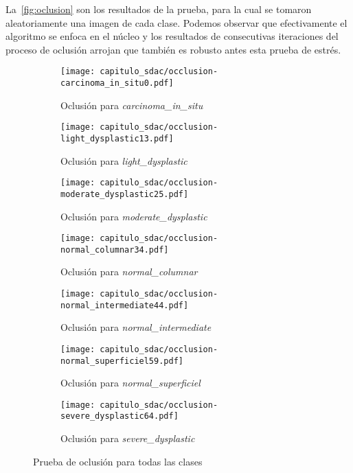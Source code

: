 La~\autoref{fig:oclusion} son los resultados de la prueba, para la cual se tomaron
aleatoriamente una imagen de cada clase. Podemos observar que efectivamente el 
algoritmo se enfoca en el núcleo y los resultados de consecutivas iteraciones del proceso
de oclusión arrojan que también es robusto antes esta prueba de estrés.
  \begin{figure}[H] %
    \begin{subfigure}{0.40\textwidth}
    \texttt{[image: capitulo\_sdac/occlusion-carcinoma\_in\_situ0.pdf]}
    \caption{Oclusión para \emph{carcinoma\_in\_situ}}\label{fig:a}
    \end{subfigure}\hspace*{\fill}
    \begin{subfigure}{0.40\textwidth}
    \texttt{[image: capitulo\_sdac/occlusion-light\_dysplastic13.pdf]}
    \caption{Oclusión para \emph{light\_dysplastic}}\label{fig:b}
    \end{subfigure}
    
    \medskip
    \begin{subfigure}{0.40\textwidth}
    \texttt{[image: capitulo\_sdac/occlusion-moderate\_dysplastic25.pdf]}
    \caption{Oclusión para \emph{moderate\_dysplastic}}\label{fig:cc}
    \end{subfigure}\hspace*{\fill}
    \begin{subfigure}{0.40\textwidth}
    \texttt{[image: capitulo\_sdac/occlusion-normal\_columnar34.pdf]}
    \caption{Oclusión para \emph{normal\_columnar}}\label{fig:dd}
    \end{subfigure}
    
    \medskip
    \begin{subfigure}{0.40\textwidth}
    \texttt{[image: capitulo\_sdac/occlusion-normal\_intermediate44.pdf]}
    \caption{Oclusión para \emph{normal\_intermediate}}\label{fig:c}
    \end{subfigure}\hspace*{\fill}
    \begin{subfigure}{0.40\textwidth}
    \texttt{[image: capitulo\_sdac/occlusion-normal\_superficiel59.pdf]}
    \caption{Oclusión para \emph{normal\_superficiel}}\label{fig:d}
    \end{subfigure}

    \centering
    \begin{subfigure}{0.40\textwidth}
      
    \texttt{[image: capitulo\_sdac/occlusion-severe\_dysplastic64.pdf]}
    \caption{Oclusión para \emph{severe\_dysplastic}}\label{fig:e}
    \end{subfigure}
    
    \caption{Prueba de oclusión para todas las clases}\label{fig:oclusion}
    \end{figure}
    

